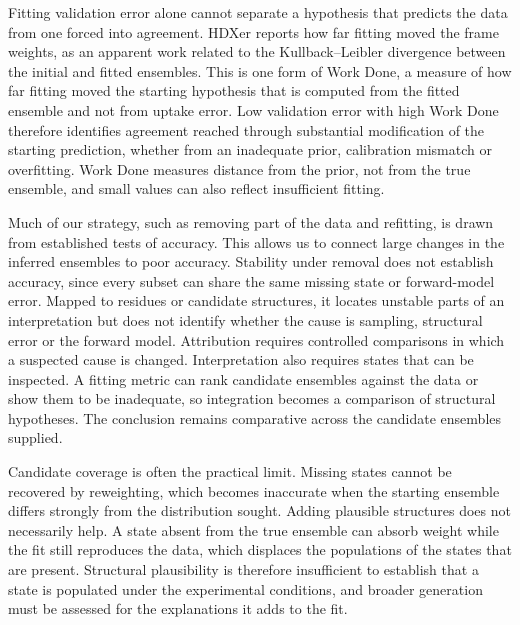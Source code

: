 Fitting validation error alone cannot separate a hypothesis that predicts the data from one forced into agreement. HDXer reports how far fitting moved the frame weights, as an apparent work related to the Kullback--Leibler divergence between the initial and fitted ensembles.\supercite{bradshawInterpretationHDXData2020} This is one form of Work Done, a measure of how far fitting moved the starting hypothesis that is computed from the fitted ensemble and not from uptake error. Low validation error with high Work Done therefore identifies agreement reached through substantial modification of the starting prediction, whether from an inadequate prior, calibration mismatch or overfitting. Work Done measures distance from the prior, not from the true ensemble, and small values can also reflect insufficient fitting.

Much of our strategy, such as removing part of the data and refitting, is drawn from established tests of accuracy. This allows us to connect large changes in the inferred ensembles to poor accuracy.\supercite{bonomiPrinciplesProteinStructural2017} Stability under removal does not establish accuracy, since every subset can share the same missing state or forward-model error. Mapped to residues or candidate structures, it locates unstable parts of an interpretation but does not identify whether the cause is sampling, structural error or the forward model. Attribution requires controlled comparisons in which a suspected cause is changed.
Interpretation also requires states that can be inspected. A fitting metric can rank candidate ensembles against the data or show them to be inadequate,\supercite{bradshawInterpretationHDXData2020} so integration becomes a comparison of structural hypotheses. The conclusion remains comparative across the candidate ensembles supplied.

Candidate coverage is often the practical limit. Missing states cannot be recovered by reweighting, which becomes inaccurate when the starting ensemble differs strongly from the distribution sought.\supercite{bonomiPrinciplesProteinStructural2017} Adding plausible structures does not necessarily help. A state absent from the true ensemble can absorb weight while the fit still reproduces the data, which displaces the populations of the states that are present. Structural plausibility is therefore insufficient to establish that a state is populated under the experimental conditions, and broader generation must be assessed for the explanations it adds to the fit.

